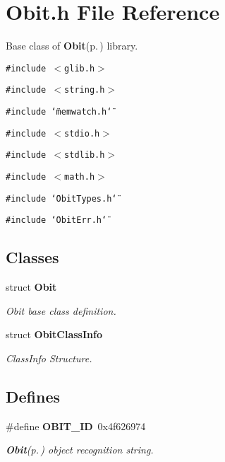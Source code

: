 \section{Obit.h File Reference}
\label{Obit_8h}
Base class of {\bf Obit}{\rm (p.\,\pageref{structObit})} library. 

{\tt \#include $<$glib.h$>$}\par
{\tt \#include $<$string.h$>$}\par
{\tt \#include \char`\"{}memwatch.h\char`\"{}}\par
{\tt \#include $<$stdio.h$>$}\par
{\tt \#include $<$stdlib.h$>$}\par
{\tt \#include $<$math.h$>$}\par
{\tt \#include \char`\"{}Obit\-Types.h\char`\"{}}\par
{\tt \#include \char`\"{}Obit\-Err.h\char`\"{}}\par
\subsection*{Classes}
\begin{CompactItemize}
\item 
struct {\bf Obit}
\begin{CompactList}\small\item\em Obit base class definition. \item\end{CompactList}\item 
struct {\bf Obit\-Class\-Info}
\begin{CompactList}\small\item\em Class\-Info Structure. \item\end{CompactList}\end{CompactItemize}
\subsection*{Defines}
\begin{CompactItemize}
\item 
\#define {\bf OBIT\_\-ID}\ 0x4f626974
\begin{CompactList}\small\item\em {\bf Obit}{\rm (p.\,\pageref{structObit})} object recognition string. \item\end{CompactList}\end{CompactItemize}
